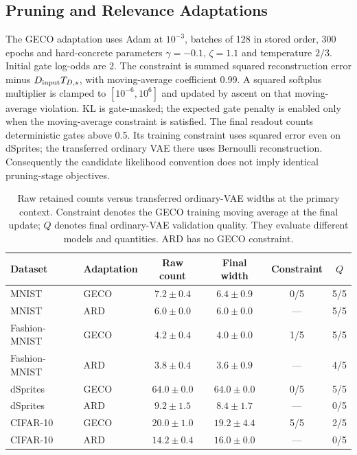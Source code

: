 \documentclass[make,article,submit,pdftex,moreauthors]{Definitions/mdpi}
\begin{document}
\subsection{Pruning and Relevance Adaptations}\label{app:adaptations}
The GECO adaptation uses Adam at $10^{-3}$, batches of 128 in stored
order, 300 epochs and hard-concrete parameters $\gamma=-0.1$,
$\zeta=1.1$ and temperature $2/3$. Initial gate log-odds are 2. The
constraint is summed squared reconstruction error minus
$D_{\rm input}T_{D,s}$, with moving-average coefficient 0.99. A squared
softplus multiplier is clamped to $[10^{-6},10^6]$ and updated by ascent
on that moving-average violation. KL is gate-masked; the expected gate
penalty is enabled only when the moving-average constraint is satisfied.
The final readout counts deterministic gates above 0.5. Its training
constraint uses squared error even on dSprites; the transferred ordinary
VAE there uses Bernoulli reconstruction. Consequently the candidate
likelihood convention does not imply identical pruning-stage objectives.

\begin{table}[H]
\caption{Raw retained counts versus transferred ordinary-VAE widths at the primary context. Constraint denotes the GECO training moving average at the final update; $Q$ denotes final ordinary-VAE validation quality. They evaluate different models and quantities. ARD has no GECO constraint.}\label{tab:pruning}
\footnotesize
\setlength{\tabcolsep}{3.5pt}
\begin{tabular*}{\textwidth}{@{\extracolsep{\fill}}llcccc@{}}
\toprule
Dataset & Adaptation & Raw count & Final width & Constraint & $Q$ \\
\midrule
MNIST & GECO & $7.2 \pm 0.4$ & $6.4 \pm 0.9$ & 0/5 & 5/5 \\
MNIST & ARD & $6.0 \pm 0.0$ & $6.0 \pm 0.0$ & --- & 5/5 \\
Fashion-MNIST & GECO & $4.2 \pm 0.4$ & $4.0 \pm 0.0$ & 1/5 & 5/5 \\
Fashion-MNIST & ARD & $3.8 \pm 0.4$ & $3.6 \pm 0.9$ & --- & 4/5 \\
dSprites & GECO & $64.0 \pm 0.0$ & $64.0 \pm 0.0$ & 0/5 & 5/5 \\
dSprites & ARD & $9.2 \pm 1.5$ & $8.4 \pm 1.7$ & --- & 0/5 \\
CIFAR-10 & GECO & $20.0 \pm 1.0$ & $19.2 \pm 4.4$ & 5/5 & 2/5 \\
CIFAR-10 & ARD & $14.2 \pm 0.4$ & $16.0 \pm 0.0$ & --- & 0/5 \\
\bottomrule
\end{tabular*}
\end{table}
\end{document}
